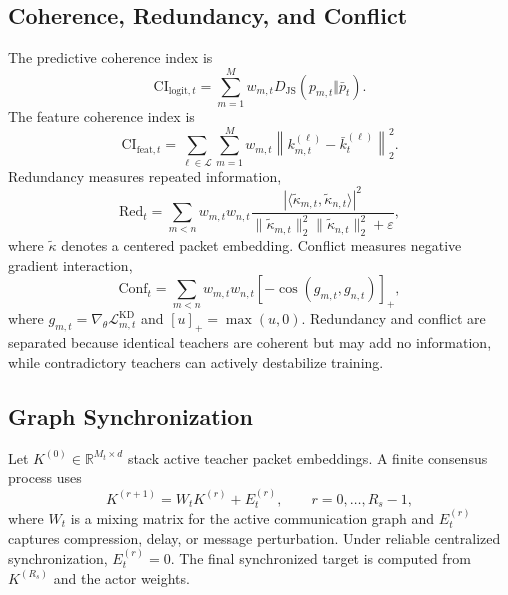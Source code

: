 \documentclass[10pt,twocolumn,a4paper]{article}
\newcommand{\R}{\mathbb{R}}
\newcommand{\JS}{D_{\mathrm{JS}}}
\newcommand{\cL}{\mathcal{L}}
\begin{document}
\subsection{Coherence, Redundancy, and Conflict}

The predictive coherence index is
\begin{equation}
 \mathrm{CI}_{\mathrm{logit},t}
 =\sum_{m=1}^{M}w_{m,t}\JS\left(p_{m,t}\Vert \bar p_t\right).
\label{eq:cilogit}
\end{equation}
The feature coherence index is
\begin{equation}
 \mathrm{CI}_{\mathrm{feat},t}
 =\sum_{\ell\in\cL}\sum_{m=1}^{M}w_{m,t}
 \left\|k_{m,t}^{(\ell)}-\bar k_t^{(\ell)}\right\|_2^2.
\label{eq:cifeat}
\end{equation}
Redundancy measures repeated information,
\begin{equation}
 \mathrm{Red}_t
 =\sum_{m<n}w_{m,t}w_{n,t}
 \frac{\left|\langle\tilde\kappa_{m,t},\tilde\kappa_{n,t}\rangle\right|^2}
 {\|\tilde\kappa_{m,t}\|_2^2\|\tilde\kappa_{n,t}\|_2^2+\varepsilon},
\label{eq:redundancy}
\end{equation}
where \(\tilde\kappa\) denotes a centered packet embedding. Conflict measures negative gradient interaction,
\begin{equation}
 \mathrm{Conf}_t
 =\sum_{m<n}w_{m,t}w_{n,t}
 \left[-\cos\left(g_{m,t},g_{n,t}\right)\right]_+,
\label{eq:conflict}
\end{equation}
where \(g_{m,t}=\nabla_\theta\cL_{m,t}^{\mathrm{KD}}\) and \([u]_+=\max(u,0)\). Redundancy and conflict are separated because identical teachers are coherent but may add no information, while contradictory teachers can actively destabilize training.

\subsection{Graph Synchronization}

Let \(K^{(0)}\in\R^{M_t\times d}\) stack active teacher packet embeddings. A finite consensus process uses
\begin{equation}
 K^{(r+1)}=W_tK^{(r)}+E_t^{(r)},\qquad r=0,\ldots,R_s-1,
\label{eq:consensus}
\end{equation}
where \(W_t\) is a mixing matrix for the active communication graph and \(E_t^{(r)}\) captures compression, delay, or message perturbation. Under reliable centralized synchronization, \(E_t^{(r)}=0\). The final synchronized target is computed from \(K^{(R_s)}\) and the actor weights.
\end{document}
